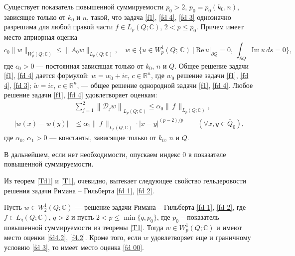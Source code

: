 \begin{theorem}\label{T1}
Существует показатель повышенной суммируемости $p_0>2$, $ p_0=p_0(k_0,n)$, зависящее
только от $k_0$ и $n$, такой, что задача \eqref{f1}, \eqref{fd 4},
\eqref{fd 3} однозначно разрешима для любой правой части $f\in L_p(Q;\mathbb C)$, $2<p\leqslant p_0$. Причем имеет место априорная оценка
\begin{equation}\label{fd 00}
c_0\|w\|_{W^1_p(Q;\mathbb C)}\leqslant \|A_0w\|_{L_p(Q;\mathbb C)},
\quad w\in \Big\{u\in  W^1_p(Q;\,\mathbb C)\ \Big|\ \mathrm{Re}\,u|_{\partial Q}=0,\
\int_{\partial Q}\mathrm{Im}\,u\,ds=0\Big\},
\end{equation}
где $c_0>0$ --- постоянная зависящая только от $k_0$, $n$ и $Q$.
 Общее решение задачи \eqref{f1}, \eqref{fd 4} дается формулой: $w=w_0+ic$, $c\in
{\mathbb R}^n$, где $w_0$ решение задачи \eqref{f1}, \eqref{fd 4},
\eqref{fd 3}; $\widetilde w=ic$, $c\in\mathbb{R}^n$, --- общее решение однородной
задачи \eqref{f1}, \eqref{fd 4}.
Любое решение задачи \eqref{f1}, \eqref{fd 4} удовлетворяет оценкам: %
\begin{align}\label{fd4.2}
& \sum_{j=1}^2\left\|\mathscr{D}_jw\right\|_{L_p(Q;
\mathbb C)}\leqslant
{\alpha}_0\|\,f\,\|_{L_p(Q;\mathbb C)},\\[2mm]
|w(x)-w(y)| & \leqslant \alpha_1\|\,f\,\|_{ L_p(Q;\mathbb C)} \cdot
|x-y|^{(p-2)/p} \qquad (\forall x,y\in {\overline Q}_0),\label{f4.2}
\end{align}
где ${\alpha}_0,\,{\alpha}_1>0$ --- константы, зависящие только от $k_0$, $n$ и $Q$.%
\end{theorem}

В дальнейшем, если нет необходимости, опускаем индекс $0$ в показателе повышенной суммируемости.

Из теорем \ref{Td1} и \ref{T1}, очевидно, вытекает следующее свойство
гельдеровости решения задачи Римана -- Гильберта \eqref{fd 1}, \eqref{fd 2}.
\begin{corollary}\label{Sl1}
Пусть $w\in W_2^1(Q;\mathbb C)$ --- решение задачи Римана -- Гильберта \eqref{fd 1},
\eqref{fd 2}, где $f\in L_q(Q;\mathbb C)$, $q>2$ и пусть $2<p\leqslant \min\{q,p_0\}$, где
$p_0$ -- показатель повышенной суммируемости из теоремы \ref{T1}.
Тогда $w\in W_p^1(Q;\mathbb C)$ и имеют место оценки \eqref{fd4.2}, \eqref{f4.2}. Кроме того, если $w$ удовлетворяет еще и граничному условию \eqref{fd 3}, то
имеет место оценка \eqref{fd 00}.
\end{corollary}

